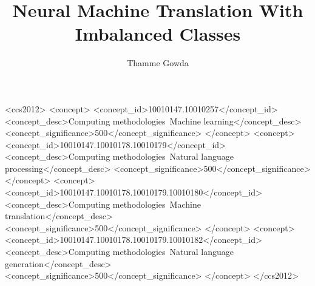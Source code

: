 

\title{Neural Machine Translation With Imbalanced Classes}

\author{Thamme Gowda}



\renewcommand{\shortauthors}{Gowda}


\begin{CCSXML}
<ccs2012>
    <concept>
       <concept_id>10010147.10010257</concept_id>
       <concept_desc>Computing methodologies~Machine learning</concept_desc>
       <concept_significance>500</concept_significance>
       </concept>
   <concept>
       <concept_id>10010147.10010178.10010179</concept_id>
       <concept_desc>Computing methodologies~Natural language processing</concept_desc>
       <concept_significance>500</concept_significance>
       </concept>
   <concept>
       <concept_id>10010147.10010178.10010179.10010180</concept_id>
       <concept_desc>Computing methodologies~Machine translation</concept_desc>
       <concept_significance>500</concept_significance>
       </concept>
   <concept>
       <concept_id>10010147.10010178.10010179.10010182</concept_id>
       <concept_desc>Computing methodologies~Natural language generation</concept_desc>
       <concept_significance>500</concept_significance>
       </concept>
 </ccs2012>
\end{CCSXML}

